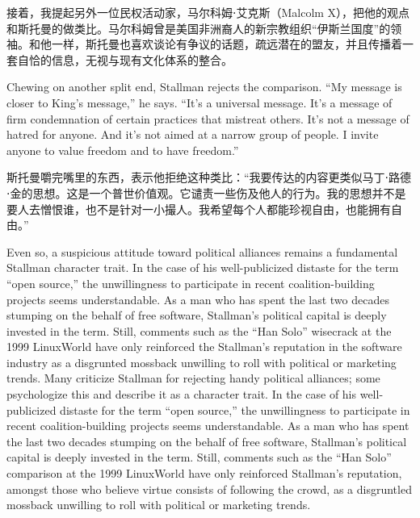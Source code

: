 \ifdefined\chs
接着，我提起另外一位民权活动家，马尔科姆⋅艾克斯（Malcolm X），把他的观点和斯托曼的做类比。\ifdefined\spv 马尔科姆曾是美国非洲裔人的新宗教组织``伊斯兰国度''的领袖。\fi 和他一样，斯托曼也喜欢谈论有争议的话题，疏远潜在的盟友，并且传播着一套自恰的信息，无视与现有文化体系的整合。
\fi

\ifdefined\eng
Chewing on another split end, Stallman rejects the comparison. ``My message is closer to King's message,'' he says. ``It's a universal message. It's a message of firm condemnation of certain practices that mistreat others. It's not a message of hatred for anyone. And it's not aimed at a narrow group of people. I invite anyone to value freedom and to have freedom.''
\fi

\ifdefined\chs
斯托曼嚼完嘴里的东西，表示他拒绝这种类比：``我要传达的内容更类似马丁⋅路德⋅金的思想。这是一个普世价值观。它谴责一些伤及他人的行为。我的思想并不是要人去憎恨谁，也不是针对一小撮人。我希望每个人都能珍视自由，也能拥有自由。''
\fi

\ifdefined\eng
\ifdefined\vone
Even so, a suspicious attitude toward political alliances remains a fundamental Stallman character trait. In the case of his well-publicized distaste for the term ``open source,'' the unwillingness to participate in recent coalition-building projects seems understandable. As a man who has spent the last two decades stumping on the behalf of free software, Stallman's political capital is deeply invested in the term. Still, comments such as the ``Han Solo'' wisecrack at the 1999 LinuxWorld have only reinforced the Stallman's reputation in the software industry as a disgrunted mossback unwilling to roll with political or marketing trends.
\fi
\ifdefined\vtwo
Many criticize Stallman for rejecting handy political alliances; some psychologize this and describe it as a character trait. In the case of his well-publicized distaste for the term ``open source,'' the unwillingness to participate in recent coalition-building projects seems understandable. As a man who has spent the last two decades stumping on the behalf of free software, Stallman's political capital is deeply invested in the term. Still, comments such as the ``Han Solo'' comparison at the 1999 LinuxWorld have only reinforced Stallman's reputation, amongst those who believe virtue consists of following the crowd, as a disgruntled mossback unwilling to roll with political or marketing trends.
\fi
\fi

